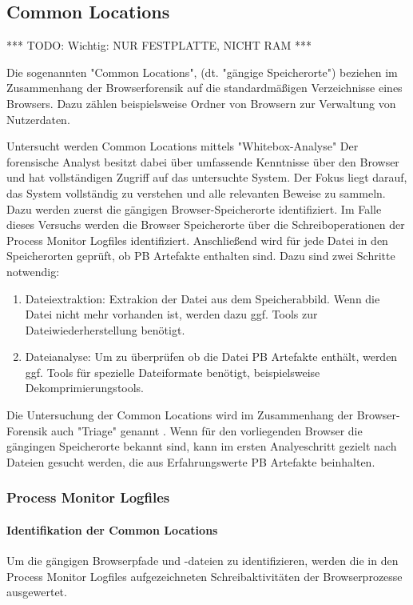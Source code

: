 \subsection{Common Locations}

*** TODO: Wichtig: NUR FESTPLATTE, NICHT RAM ***

Die sogenannten "Common Locations", (dt. "gängige Speicherorte") beziehen im Zusammenhang der Browserforensik auf die standardmäßigen Verzeichnisse eines Browsers. 
Dazu zählen beispielsweise Ordner von Browsern zur Verwaltung von Nutzerdaten.

Untersucht werden Common Locations mittels "Whitebox-Analyse" \cite{Bonetti.2014}
Der forensische Analyst besitzt dabei über umfassende Kenntnisse über den Browser und hat vollständigen Zugriff auf das untersuchte System. 
Der Fokus liegt darauf, das System vollständig zu verstehen und alle relevanten Beweise zu sammeln.
Dazu werden zuerst die gängigen Browser-Speicherorte identifiziert. 
Im Falle dieses Versuchs werden die Browser Speicherorte über die Schreiboperationen der Process Monitor Logfiles identifiziert.
Anschließend wird für jede Datei in den Speicherorten geprüft, ob PB Artefakte enthalten sind.
Dazu sind zwei Schritte notwendig:
\begin{enumerate}
\item Dateiextraktion: Extrakion der Datei aus dem Speicherabbild. Wenn die Datei nicht mehr vorhanden ist, werden dazu ggf. Tools zur Dateiwiederherstellung benötigt.
\item Dateianalyse: Um zu überprüfen ob die Datei PB Artefakte enthält, werden ggf. Tools für spezielle Dateiformate benötigt, beispielsweise Dekomprimierungstools.
\end{enumerate}

Die Untersuchung der Common Locations wird im Zusammenhang der Browser-Forensik auch "Triage" genannt \cite{Horsman.2019}. Wenn für den vorliegenden Browser die gängingen Speicherorte bekannt sind, kann im ersten Analyeschritt gezielt nach Dateien gesucht werden, die aus Erfahrungswerte PB Artefakte beinhalten.

\subsubsection*{Process Monitor Logfiles}

\paragraph*{Identifikation der Common Locations}
Um die gängigen Browserpfade und -dateien zu identifizieren, werden die in den Process Monitor Logfiles aufgezeichneten Schreibaktivitäten der Browserprozesse ausgewertet.

